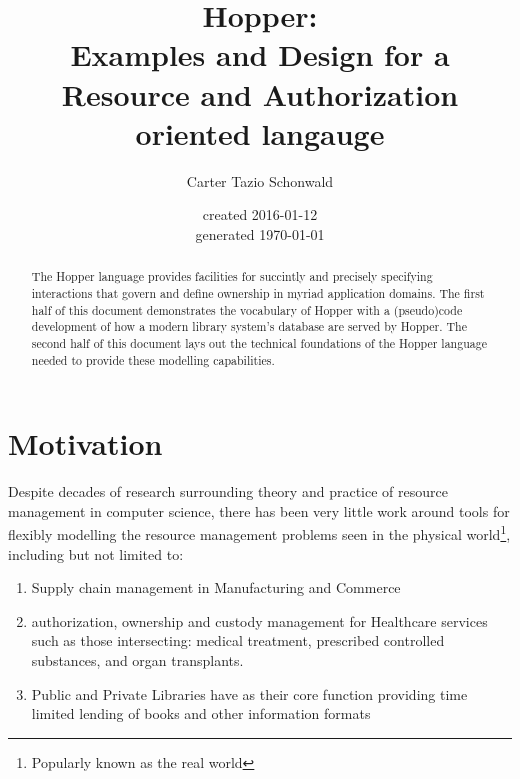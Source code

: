 \documentclass[letterpaper,11pt,reqno]{amsart}
\newcommand{\now}{\fullisodate
  \today  \usdate}
\theoremstyle{plain}
\theoremstyle{definition}
\theoremstyle{remark}
\begin{document}
\title{Hopper:\\ Examples and Design for a Resource and Authorization oriented langauge}
\author{Carter Tazio Schonwald}
\date{created 2016-01-12\\generated \now}
\begin{abstract}
The Hopper language provides facilities for succintly and precisely specifying interactions that govern and define ownership in myriad application domains.
The first half of this document demonstrates the vocabulary of Hopper with a (pseudo)code development of how a modern library system's database are served by Hopper.
The second half of this document lays out the technical foundations of the Hopper language
needed to provide these modelling capabilities.

\end{abstract}


\maketitle

\todototoc
\makeatletter
\providecommand\@dotsep{5}
\makeatother
\listoftodos\relax


\section{Motivation} Despite decades of research surrounding theory and practice of resource management in computer science, %
there has been very little work around tools for flexibly modelling the resource management problems
seen in the physical world\footnote{Popularly known as the real world\texttrademark}, including but not limited to:
\begin{enumerate}
  \item Supply chain management in Manufacturing and Commerce
  \item authorization, ownership and custody management for Healthcare services such as those intersecting: medical treatment, prescribed controlled substances, and organ transplants. 
  \item Public and Private Libraries have as their core function providing time limited lending of
  books and other information formats
\end{enumerate}


\end{document}
